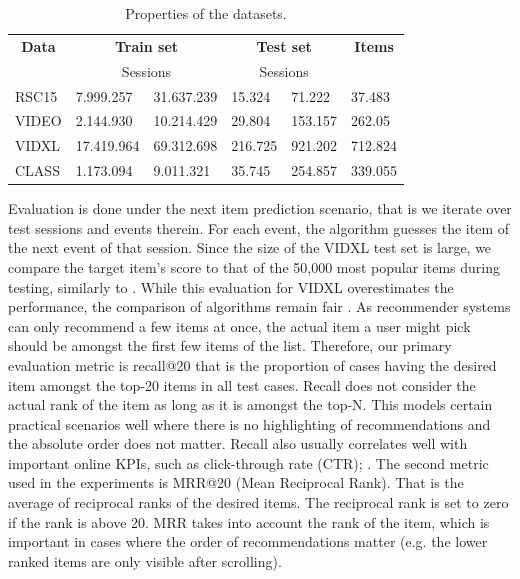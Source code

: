 \documentclass{article} %
\begin{document}
\begin{table}[htbp]
\centering
\caption{Properties of the datasets.} 
\label{table1} 


\begin{tabular}{llllll}
\hline
\multicolumn{1}{c}{\multirow{}{}{\textbf{Data}}} & \multicolumn{2}{c}{\textbf{Train set}} & \multicolumn{2}{c}{\textbf{Test set}} & \multicolumn{1}{c}{\multirow{}{}{\textbf{Items}}} \\
\multicolumn{1}{c}{}                               & \multicolumn{2}{c}{Sessions}           & \multicolumn{2}{c}{Sessions}          & \multicolumn{1}{c}{}                                \\
\hline
RSC15                                              & 7.999.257          & 31.637.239        & 15.324            & 71.222            & 37.483                                              \\
VIDEO                                              & 2.144.930          & 10.214.429        & 29.804            & 153.157           & 262.05                                              \\
VIDXL                                              & 17.419.964         & 69.312.698        & 216.725           & 921.202           & 712.824                                             \\
CLASS                                              & 1.173.094          & 9.011.321         & 35.745            & 254.857           & 339.055                                            
\end{tabular}
\end{table}

Evaluation is done under the next item prediction scenario, that is we iterate over test sessions and events therein. For each event, the algorithm guesses the item of the next event of that session. Since the size of the VIDXL test set is large, we compare the target item’s score to that of the 50,000 most popular items during testing, similarly to \cite{hidasi2016a}. While this evaluation for VIDXL overestimates the performance, the comparison of algorithms remain fair \cite{bellogin2011precision}. As recommender systems can only recommend a few items at once, the actual item a user might pick should be amongst the first few items of the list. Therefore, our primary evaluation metric is recall@20 that is the proportion of cases having the desired item amongst the top-20 items in all test cases. Recall does not consider the actual rank of the item as long as it is amongst the top-N. This models certain practical scenarios well where there is no highlighting of recommendations and the absolute order does not matter. Recall also usually correlates well with important online KPIs, such as click-through rate (CTR)\cite{liu2012enlister}; \cite{hidasi2012fast}. The second metric used in the experiments is MRR@20 (Mean Reciprocal Rank). That is the average of reciprocal ranks of the desired items. The reciprocal rank is set to zero if the rank is above 20. MRR takes into account the rank of the item, which is important in cases where the order of recommendations matter (e.g. the
lower ranked items are only visible after scrolling).
\end{document}
